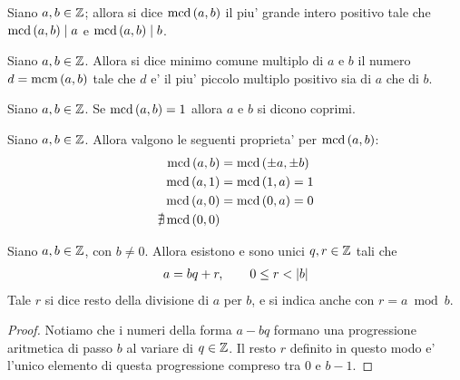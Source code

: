\begin{definition}
    Siano $a, b \in \mathbb{Z}$; allora si dice $\operatorname{mcd}\left(a, b\right)$ il piu' grande intero positivo
    tale che $\operatorname{mcd}\left(a, b\right) \mid a$ e $\operatorname{mcd}\left(a, b\right) \mid b$.
\end{definition}

\begin{definition}
    Siano $a, b \in \mathbb{Z}$. Allora si dice minimo comune multiplo di $a$ e $b$ il numero $d = \operatorname{mcm}\left(a, b\right)$ tale che $d$ e' il piu' piccolo multiplo positivo sia di $a$ che di $b$.
\end{definition}

\begin{definition}[Coprimo]
    Siano $a, b \in \mathbb{Z}$. Se $\operatorname{mcd}\left(a, b\right) = 1$ allora $a$ e $b$ si dicono coprimi.
\end{definition}

\begin{remark}
    Siano $a, b \in \mathbb{Z}$. Allora valgono le seguenti proprieta' per $\operatorname{mcd}\left(a, b\right)$:
    \begin{align*}
        \operatorname{mcd}\left(a, b\right) &= \operatorname{mcd}\left(\pm a, \pm b\right) \\
        \operatorname{mcd}\left(a, 1\right) &= \operatorname{mcd}\left(1, a\right) = 1 \\
        \operatorname{mcd}\left(a, 0\right) &= \operatorname{mcd}\left(0, a\right) = 0 \\
        \nexists \operatorname{mcd}\left(0, 0\right)
    \end{align*}
\end{remark}

\begin{theorem} \label{esistenza_resto}
    Siano $a, b \in \mathbb{Z}$, con $b \neq 0$. Allora esistono e sono unici $q, r \in \mathbb{Z}$ tali che
    \begin{align}
        a = bq + r, \qquad0 \leq r < \left|b\right|
    \end{align}
    Tale $r$ si dice resto della divisione di $a$ per $b$, e si indica anche con $r = a\bmod b$.
\end{theorem}

\begin{proof}
    Notiamo che i numeri della forma $a - bq$ formano una progressione aritmetica di passo $b$ al variare di $q \in \mathbb{Z}$. 
    Il resto $r$ definito in questo modo e' l'unico elemento di questa progressione compreso tra $0$ e $b - 1$.
\end{proof}

